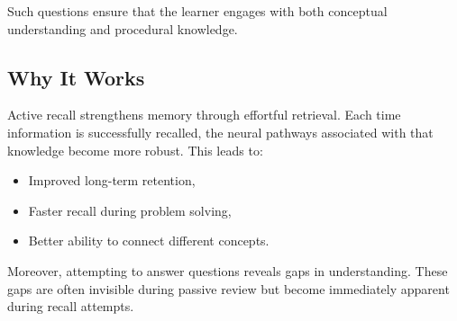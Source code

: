 \documentclass{article}
\begin{document}
Such questions ensure that the learner engages with both conceptual understanding and procedural knowledge.

\subsection{Why It Works}

Active recall strengthens memory through effortful retrieval. Each time information is successfully recalled, the neural pathways associated with that knowledge become more robust. This leads to:
\begin{itemize}
  \item Improved long-term retention,
  \item Faster recall during problem solving,
  \item Better ability to connect different concepts.
\end{itemize}

Moreover, attempting to answer questions reveals gaps in understanding. These gaps are often invisible during passive review but become immediately apparent during recall attempts.

\clearpage

\tableofcontents

\clearpage





\end{document}
